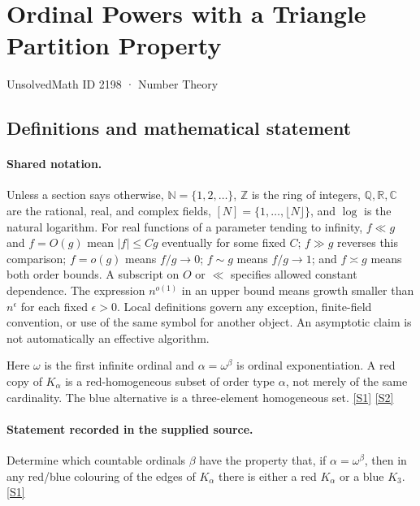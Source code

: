 \documentclass[11pt,a4paper]{article}
\newcommand{\N}{\mathbb{N}}
\newcommand{\Z}{\mathbb{Z}}
\newcommand{\Q}{\mathbb{Q}}
\newcommand{\R}{\mathbb{R}}
\newcommand{\C}{\mathbb{C}}
\newcommand{\sref}[2]{\hyperlink{source:#1:#2}{[S#2]}}
\begin{document}

\setcounter{section}{2197}

\section{Ordinal Powers with a Triangle Partition Property}\label{2198}

{\small\sffamily UnsolvedMath ID 2198 · Number Theory}

\subsection{Definitions and mathematical statement}

\paragraph{Shared notation.}Unless a section says otherwise, $\N=\{1,2,\ldots\}$,
$\Z$ is the ring of integers, $\Q,\R,\C$ are the rational, real, and complex
fields, $[N]=\{1,\ldots,\lfloor N\rfloor\}$, and $\log$ is the natural
logarithm. For real functions of a parameter tending to infinity,
$f\ll g$ and $f=O(g)$ mean $|f|\leq Cg$ eventually for some fixed $C$;
$f\gg g$ reverses this comparison; $f=o(g)$ means $f/g\to0$;
$f\sim g$ means $f/g\to1$; and $f\asymp g$ means both order bounds.
A subscript on $O$ or $\ll$ specifies allowed constant dependence.
The expression $n^{o(1)}$ in an upper bound means growth smaller than
$n^\epsilon$ for each fixed $\epsilon>0$. Local definitions govern any
exception, finite-field convention, or use of the same symbol for another
object. An asymptotic claim is not automatically an effective algorithm.



Here $\omega$ is the first infinite ordinal and $\alpha=\omega^\beta$ is ordinal exponentiation. A red copy of $K_\alpha$ is a red-homogeneous subset of order type $\alpha$, not merely of the same cardinality. The blue alternative is a three-element homogeneous set. \sref{2198}{1} \sref{2198}{2}

\paragraph{Statement recorded in the supplied source.}
Determine which countable ordinals $\beta$ have the property that, if $\alpha=\omega^\beta$, then in any red/blue colouring of the edges of $K_\alpha$ there is either a red $K_\alpha$ or a blue $K_3$. \sref{2198}{1}
\end{document}
